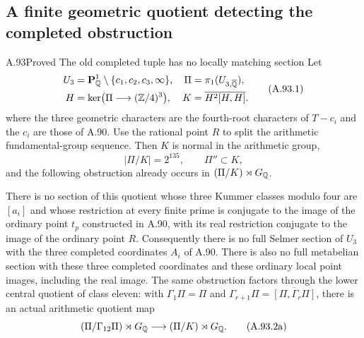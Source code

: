 \subsection{A finite geometric quotient detecting the completed obstruction}

\begin{statement}{A.93}{Proved}
{The old completed tuple has no locally matching section}
Let
\[
 \begin{aligned}
 U_3&=\mathbf P^1_\mathbb Q\setminus\{c_1,c_2,c_3,\infty\},
 &\Pi&=\pi_1(U_{3,\overline{\mathbb Q}}),\\
 H&=\ker\bigl(\Pi\longrightarrow(\mathbb Z/4)^3\bigr),
 &K&=\overline{H^2[H,H]} .
 \end{aligned}
 \tag{A.93.1}
\]
where the three geometric characters are the fourth-root
characters of $T-c_i$ and the $c_i$ are those of A.90.
Use the rational point $R$ to split the arithmetic
fundamental-group sequence.
Then $K$ is normal in the arithmetic group,
\[
 |\Pi/K|=2^{135},\qquad \Pi''\subset K ,
 \tag{A.93.2}
\]
and the following obstruction already occurs in
$(\Pi/K)\rtimes G_\mathbb Q$.

There is no section of this quotient whose three
Kummer classes modulo four are $[a_i]$ and whose
restriction at every finite prime is conjugate to
the image of the ordinary point $t_p$ constructed
in A.90, with its real restriction conjugate to
the image of the ordinary point $R$.
Consequently there is no full Selmer section of
$U_3$ with the three completed coordinates $A_i$
of A.90.
There is also no full metabelian section with
these three completed coordinates and these
ordinary local point images, including the real image.
The same obstruction factors through the lower
central quotient of class eleven:
with $\Gamma_1\Pi=\Pi$ and
$\Gamma_{r+1}\Pi=\overline{[\Pi,\Gamma_r\Pi]}$,
there is an actual arithmetic quotient map
\[
       (\Pi/\Gamma_{12}\Pi)\rtimes G_\mathbb Q
                         \longrightarrow(\Pi/K)\rtimes G_\mathbb Q .
 \tag{A.93.2a}
\]
\end{statement}

